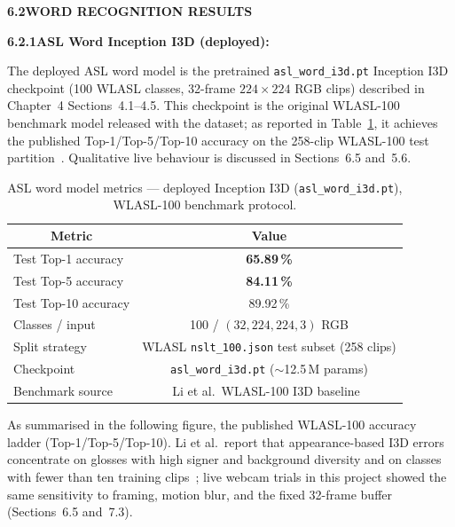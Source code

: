 \noindent\textbf{6.2\quad WORD RECOGNITION RESULTS}\par
{}
\vspace{0.2cm}

\noindent\textbf{6.2.1\quad ASL Word Inception I3D (deployed):}\par
{}
\vspace{0.3cm}

\noindent The deployed ASL word model is the pretrained \texttt{asl\_word\_i3d.pt} Inception I3D checkpoint (100 WLASL classes, 32-frame $224\!\times\!224$ RGB clips) described in Chapter~4 Sections~4.1--4.5. This checkpoint is the original WLASL-100 benchmark model released with the dataset; as reported in Table~\ref{tab:ch5-asl-word}, it achieves the published Top-1/Top-5/Top-10 accuracy on the 258-clip WLASL-100 test partition~\cite{li2020wlasl}. Qualitative live behaviour is discussed in Sections~6.5 and~5.6.\par\vspace{0.3cm}

\begin{table}[H]
\centering
\caption{ASL word model metrics --- deployed Inception I3D (\texttt{asl\_word\_i3d.pt}), WLASL-100 benchmark protocol.}
\label{tab:ch5-asl-word}
\small
\begin{tabular}{|l|c|}
\hline
\multicolumn{1}{|c|}{\textbf{Metric}} & \multicolumn{1}{|c|}{\textbf{Value}}\\
\hline
Test Top-1 accuracy & \textbf{65.89\,\%} \\
\hline
Test Top-5 accuracy & \textbf{84.11\,\%} \\
\hline
Test Top-10 accuracy & 89.92\,\% \\
\hline
Classes / input & 100 / $(32, 224, 224, 3)$ RGB \\
\hline
Split strategy & WLASL \texttt{nslt\_100.json} test subset (258 clips) \\
\hline
Checkpoint & \texttt{asl\_word\_i3d.pt} ($\sim$12.5\,M params) \\
\hline
Benchmark source & Li et al.\ WLASL-100 I3D baseline~\cite{li2020wlasl} \\
\hline
\end{tabular}
\end{table}
\vspace{0.3cm}

\noindent As summarised in the following figure, the published WLASL-100 accuracy ladder (Top-1/Top-5/Top-10). Li et al.\ report that appearance-based I3D errors concentrate on glosses with high signer and background diversity and on classes with fewer than ten training clips~\cite{li2020wlasl}; live webcam trials in this project showed the same sensitivity to framing, motion blur, and the fixed 32-frame buffer (Sections~6.5 and~7.3).\par\vspace{0.3cm}

